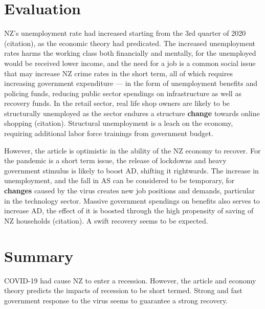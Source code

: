 \documentclass[a4paper,12pt]{article}
\begin{document}
\section*{Evaluation}

NZ's unemployment rate had increased starting from the 3rd quarter of 2020 (citation), as the economic theory had predicated. The increased unemployment rates harms the working class both financially and mentally, for the unemployed would be received lower income, and the need for a job is a common social issue that may increase NZ crime rates in the short term, all of which requires increasing government expenditure --- in the form of unemployment benefits and policing funds, reducing public sector spendings on infrastructure as well as recovery funds. In the retail sector, real life shop owners are likely to be structurally unemployed as the sector endures a structure \textbf{change} towards online shopping (citation). Structural unemployment is a leach on the economy, requiring additional labor force trainings from government budget.

However, the article is optimistic in the ability of the NZ economy to recover. For the pandemic is a short term issue, the release of lockdowns and heavy government stimulus is likely to boost AD, shifting it rightwards. The increase in unemployment, and the fall in AS can be considered to be temporary, for \textbf{changes} caused by the virus creates new job positions and demands, particular in the technology sector. Massive government spendings on benefits also serves to increase AD, the effect of it is boosted through the high propensity of saving of NZ households (citation). A swift recovery seems to be expected.


\section*{Summary}

COVID-19 had cause NZ to enter a recession. However, the article and economy theory predicts the impacts of recession to be short termed. Strong and fast government response to the virus seems to guarantee a strong recovery.
\end{document}
